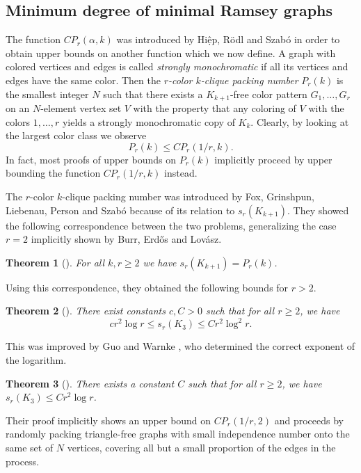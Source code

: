 \documentclass[12pt]{article}
\newtheorem{theorem}{Theorem}
\theoremstyle{definition}
\begin{document}
	\subsection{Minimum degree of minimal Ramsey graphs} \label{subsec:minimalramsey}
	
	The function $CP_r(\alpha,k)$ was introduced by Hiệp, R\"odl and Szab\'o \cite{han} in order to obtain upper bounds on another function which we now define.
	A graph with colored vertices and edges is called \textit{strongly monochromatic} if all its vertices and edges have the same color. Then the \textit{$r$-color $k$-clique packing number} $P_r(k)$ is the smallest integer $N$ such that there exists a $K_{k+1}$-free color pattern $G_1,\dots,G_r$ on an $N$-element vertex set $V$ with the property that any coloring of $V$ with the colors $1,\dots,r$ yields a strongly monochromatic copy of $K_{k}$. Clearly, by looking at the largest color class we observe
	\[P_r(k) \leq CP_r(1/r,k).\]
	In fact, most proofs of upper bounds on $P_r(k)$ implicitly proceed by upper bounding the function $CP_r(1/r,k)$ instead.
	
	The $r$-color $k$-clique packing number was introduced by Fox, Grinshpun, Liebenau, Person and Szab\'o \cite{fox2016minimum} because of its relation to $s_{r}(K_{k+1})$. They showed the following correspondence between the two problems, generalizing the case $r = 2$ implicitly shown by Burr, Erd\H{o}s and Lov\'asz.
	
	\begin{theorem}[\cite{fox2016minimum}]
		For all $k,r \geq 2$ we have $s_r(K_{k+1}) = P_r(k)$.
	\end{theorem}
	
	Using this correspondence, they obtained the following bounds for $r > 2$.
	
	\begin{theorem}[\cite{fox2016minimum}]
		There exist constants $c,C > 0$ such that for all $r \geq 2$, we have 
		\[cr^2\log r \leq s_r(K_3)\leq Cr^2\log^2 r.\]
	\end{theorem}
	
	This was improved by Guo and Warnke \cite{GW20}, who determined the correct exponent of the logarithm.
	
	\begin{theorem}[\cite{GW20}]\label{thm:GW}
		There exists a constant $C$ such that for all $r \geq 2$, we have $s_r(K_3) \leq  Cr^2\log r$.
	\end{theorem}
	
	Their proof implicitly shows an upper bound on $CP_r(1/r,2)$ and proceeds by randomly packing triangle-free graphs with small independence number onto the same set of $N$ vertices, covering all but a small proportion of the edges in the process.
	
\end{document}
